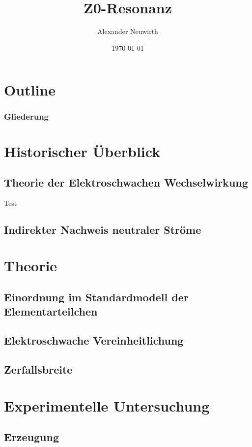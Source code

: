 \documentclass[german, ngerman]{beamer}
\title[Z0 Resonanz]{Z0-Resonanz} %
\author{Alexander Neuwirth}
\date{\today}
\begin{document}
\begin{frame}
	\titlepage
\end{frame}

\section*{Outline}
\begin{frame}
\frametitle{Gliederung}
\tableofcontents[hideallsubsections]
\end{frame}


\section{Historischer Überblick}
\subsection{Theorie der Elektroschwachen Wechselwirkung}
\begin{iframe}
Test
\end{iframe}
\subsection{Indirekter Nachweis neutraler Ströme}
\section{Theorie}
\subsection{Einordnung im Standardmodell der Elementarteilchen}
\subsection{Elektroschwache Vereinheitlichung}
\subsection{Zerfallsbreite}
\section{Experimentelle Untersuchung}
\subsection{Erzeugung}
\end{document}
